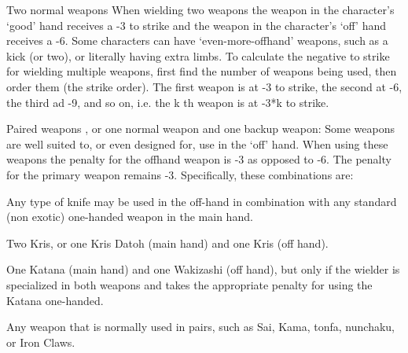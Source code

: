 \documentclass[twoside]{book}
\begin{document}
                 Two normal weapons   
                   When wielding two weapons the weapon in the
                  character's `good' hand receives a -3
                  to strike and the weapon in the character's
                  `off' hand receives a -6. Some characters
                  can have `even-more-offhand' weapons, such
                  as a kick (or two), or literally having extra limbs. To
                  calculate the negative to strike for wielding multiple
                  weapons, first find the number of weapons being used,
                  then order them (the strike order). The first weapon is
                  at -3 to strike, the second at -6, the third ad -9, and
                  so on, i.e. the k
                   th   weapon is at -3*k to strike. 
                  
                
                
                 Paired weapons   
                  , or one normal weapon and one backup weapon:
                  Some weapons are well suited to, or even designed for,
                  use in the `off' hand. When using these
                  weapons the penalty for the offhand weapon is -3 as
                  opposed to -6. The penalty for the primary weapon
                  remains -3. Specifically, these combinations are:
                    
                    
                         Any type of knife may be used in the
                         off-hand in combination with any standard (non
                         exotic) one-handed weapon in the main hand.
                         
                      
                    
                       Two Kris, or one Kris Datoh (main hand) and
                       one Kris (off hand). 
                      
                    
                       One Katana (main hand) and one Wakizashi
                       (off hand), but only if the wielder is specialized
                       in both weapons and takes the appropriate penalty
                       for using the Katana one-handed. 
                      
                    
                       Any weapon that is normally used in pairs,
                       such as Sai, Kama, tonfa, nunchaku, or Iron Claws.
                       
                      
                    
\end{document}
